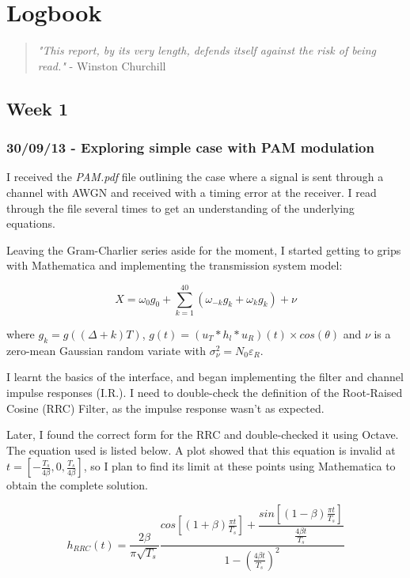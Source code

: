 \chapter{Logbook}

\begin{quote}
\textit{"This report, by its very length, defends itself against the risk of being read."} - Winston Churchill
\end{quote}

\section{Week 1}

\subsection{30/09/13 - Exploring simple case with PAM modulation}

I received the \emph{PAM.pdf} file outlining the case where a signal is
sent through a channel with AWGN and received with a timing error at the
receiver. I read through the file several times to get an understanding
of the underlying equations.

Leaving the Gram-Charlier series aside for the moment, I started getting
to grips with Mathematica and implementing the transmission system
model:

\[
X = \omega_0 g_0 + \sum_{k=1}^{40} ( \omega_{-k} g_{k} + \omega_k g_k ) + \nu
\]

where $g_k = g((\Delta + k)T)$,
$g(t) = (u_T \ast h_l \ast u_R)(t) \times cos(\theta)$ and $\nu$ is a
zero-mean Gaussian random variate with
$\sigma_{\nu}^2 = N_0 \varepsilon_R$.

I learnt the basics of the interface, and began implementing the filter
and channel impulse responses (I.R.). I need to double-check the
definition of the Root-Raised Cosine (RRC) Filter, as the impulse
response wasn't as expected.

Later, I found the correct form for the RRC \cite{[12]} and double-checked it using Octave. The equation used is listed below. A plot showed that this equation is invalid at
$t = \left [ - \frac{T_s}{ 4 \beta } , 0 , \frac{T_s}{ 4 \beta } \right ]$,
so I plan to find its limit at these points using Mathematica to obtain
the complete solution.

\[
h_{RRC}(t) = \frac{2 \beta}{\pi \sqrt{T_s}} \frac{cos \left [ (1 + \beta) \frac{\pi t}{T_s} \right ] + \dfrac{sin \left [ (1 - \beta) \frac{\pi t}{T_s} \right ]}{\frac{4 \beta t}{T_s}}}{1 - \left ( \frac{4 \beta t}{T_s} \right )^2}
\]

